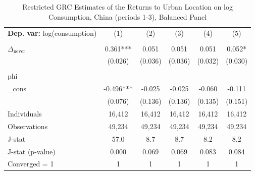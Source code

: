 \begin{table}[htbp] \centering \begin{threeparttable}
 \caption{Restricted GRC Estimates of the Returns to Urban Location on log Consumption, China (periods 1-3), Balanced Panel} 
 \label{tab:GRC_CHN123_consumption_urban_bal} 
\begin{tabular}{l ccccc} \toprule  \textbf{Dep. var:}  log(consumption) 
                    &\multicolumn{1}{c}{(1)}   &\multicolumn{1}{c}{(2)}   &\multicolumn{1}{c}{(3)}   &\multicolumn{1}{c}{(4)}   &\multicolumn{1}{c}{(5)}   \\
                    &               &               &               &               &               \\
\addlinespace
$\Delta_{\text{never}}$&       0.361***&       0.051   &       0.051   &       0.051   &       0.052*  \\
                    &     (0.026)   &     (0.036)   &     (0.036)   &     (0.032)   &     (0.030)   \\
                    &               &               &               &               &               \\
\addlinespace
phi                 &               &               &               &               &               \\
_cons               &      -0.496***&      -0.025   &      -0.025   &      -0.060   &      -0.111   \\
                    &     (0.076)   &     (0.136)   &     (0.136)   &     (0.135)   &     (0.151)   \\
\addlinespace
Individuals         &      16,412   &      16,412   &      16,412   &      16,412   &      16,412   \\
Observations        &      49,234   &      49,234   &      49,234   &      49,234   &      49,234   \\
J-stat              &        57.0   &         8.7   &         8.7   &         8.2   &         8.2   \\
J-stat (p-value)    &       0.000   &       0.069   &       0.069   &       0.083   &       0.084   \\
Converged = 1       &           1   &           1   &           1   &           1   &           1   \\

\end{tabular}
\end{threeparttable}
\end{table}
